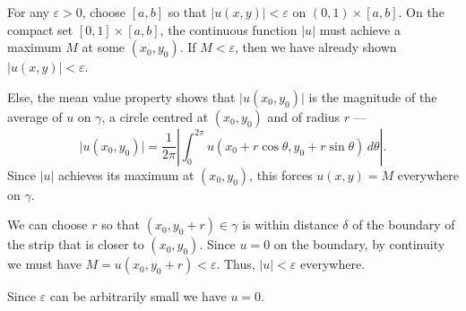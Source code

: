 \documentclass[12 pt, letterpaper]{hmcpset}
\begin{document}
\begin{solution}
	For any $\varepsilon > 0$, choose $[a, b]$ so that $\lvert u(x, y) \rvert < \varepsilon$ on $(0, 1) \times [a, b]$.  On the compact set $[0, 1] \times [a, b]$, the continuous function $\lvert u \rvert$ must achieve a maximum  $M$ at some $(x_{0}, y_{0})$. If $M < \varepsilon$, then we have already shown  $\lvert u(x, y) \rvert < \varepsilon$.

	Else, the mean value property shows that $\lvert u(x_{0}, y_{0}) \rvert$ is the magnitude of the average of $u$ on $\gamma$, a circle centred at $(x_{0}, y_{0})$ and of radius $r$ ---
	\[
		\lvert u(x_{0}, y_{0}) \rvert = \frac{1}{2 \pi} \left \lvert \int_{0}^{2 \pi} u(x_{0} + r \cos{\theta}, y_{0} + r \sin{\theta}) \, d\theta \right \rvert.
	\]
	Since $\lvert u \rvert$ achieves its maximum at $(x_{0}, y_{0})$, this forces $u(x, y) = M$ everywhere on $\gamma$. 

	We can choose $r$ so that $(x_{0}, y_{0} + r) \in \gamma$ is within distance $\delta$ of the boundary of the strip that is closer to $(x_{0}, y_{0})$. Since $u = 0$ on the boundary, by continuity we must have $M = u(x_{0}, y_{0} + r) < \varepsilon$. Thus, $\lvert u \rvert < \varepsilon$ everywhere. 

	Since $\varepsilon$ can be arbitrarily small we have $u = 0$.
\end{solution}
\end{document}
